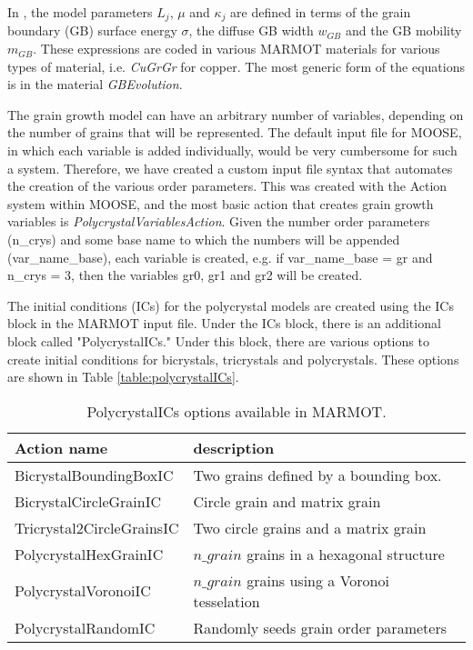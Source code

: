 \documentclass[letter,12pt,fleqn]{article}
\begin{document}
In \citet{moelans2008}, the model parameters $L_j$, $\mu$ and $\kappa_j$ are defined in terms of the grain boundary (GB) surface energy $\sigma$, the diffuse GB width $w_{GB}$ and the GB mobility $m_{GB}$. These expressions are coded in various MARMOT materials for various types of material, i.e. \emph{CuGrGr} for copper. The most generic form of the equations is in the material \emph{GBEvolution}.

The grain growth model can have an arbitrary number of variables, depending on the number of grains that will be represented. The default input file for MOOSE, in which each variable is added individually, would be very cumbersome for such a system. Therefore, we have created a custom input file syntax that automates the creation of the various order parameters.  This was created with the Action system within MOOSE, and the most basic action that creates grain growth variables is \emph{PolycrystalVariablesAction}. Given the number order parameters (n\_crys) and some base name to which the numbers will be appended (var\_name\_base), each variable is created, e.g. if var\_name\_base = gr and n\_crys = 3, then the variables gr0, gr1 and gr2 will be created.

The initial conditions (ICs) for the polycrystal models are created using the ICs block in the MARMOT input file. Under the ICs block, there is an additional block called "PolycrystalICs." Under this block, there are various options to create initial conditions for bicrystals, tricrystals and polycrystals. These options are shown in Table \ref{table:polycrystalICs}.
\begin{table}[htdp]
\caption{PolycrystalICs options available in MARMOT.\label{table:polycrystalICs}}
\begin{center}
\begin{tabular}{|l|l|}
\hline
Action name & description \\
\hline
BicrystalBoundingBoxIC & Two grains defined by a bounding box. \\
BicrystalCircleGrainIC & Circle grain and matrix grain \\
Tricrystal2CircleGrainsIC & Two circle grains and a matrix grain\\
PolycrystalHexGrainIC & $n\_grain$ grains in a hexagonal structure\\
PolycrystalVoronoiIC & $n\_grain$ grains using a Voronoi tesselation\\
PolycrystalRandomIC & Randomly seeds grain order parameters\\
\hline
\end{tabular}
\end{center}
\label{default}
\end{table}%
\end{document}
